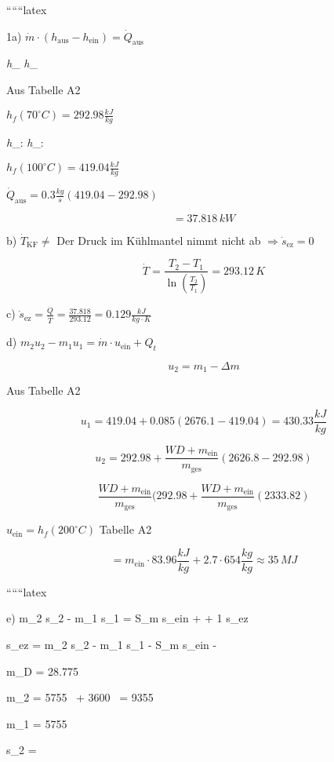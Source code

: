 
``````latex


1a) $\dot{m} \cdot (h_{\text{aus}} - h_{\text{ein}}) = \dot{Q}_{\text{aus}}$

\textit{h}_{} \textit{h}_{}

Aus Tabelle A2

$h_f(70^\circ C) = 292.98 \frac{kJ}{kg}$

\textit{h}_{}: \textit{h}_{}:

$h_f(100^\circ C) = 419.04 \frac{kJ}{kg}$

$\dot{Q}_{\text{aus}} = 0.3 \frac{kg}{s} (419.04 - 292.98)$

\[
= 37.818 \, kW
\]

b) $\dot{T}_{\text{KF}} \neq$ Der Druck im Kühlmantel nimmt nicht ab $\Rightarrow \dot{s}_{\text{ez}} = 0$

\[
\dot{T} = \frac{T_2 - T_1}{\ln \left( \frac{T_2}{T_1} \right)} = 293.12 \, K
\]

c) $\dot{s}_{\text{ez}} = \frac{\dot{Q}}{\dot{T}} = \frac{37.818}{293.12} = 0.129 \frac{kJ}{kg \cdot K}$

d) $m_2 u_2 - m_1 u_1 = \dot{m} \cdot u_{\text{ein}} + Q_t$

\[
u_2 = m_1 - \Delta m
\]

Aus Tabelle A2

\[
u_1 = 419.04 + 0.085 (2676.1 - 419.04) = 430.33 \frac{kJ}{kg}
\]

\[
u_2 = 292.98 + \frac{WD + m_{\text{ein}}}{m_{\text{ges}}} (2626.8 - 292.98)
\]

\[
\frac{WD + m_{\text{ein}}}{m_{\text{ges}}} (292.98 + \frac{WD + m_{\text{ein}}}{m_{\text{ges}}} (2333.82)
\]

$u_{\text{ein}} = h_f(200^\circ C)$ Tabelle A2

\[
= m_{\text{ein}} \cdot 83.96 \frac{kJ}{kg} + 2.7 \cdot 654 \frac{kg}{kg} \approx 35 \, MJ
\]

``````latex


e) \quad m_2 s_2 - m_1 s_1 = S_m s_{ein} +  + 1 s_{ez}

\quad s_{ez} = m_2 s_2 - m_1 s_1 - S_m s_{ein} - 

 \quad m_D = 28.775 \, 

\quad m_2 = 5755 \,  + 3600 \,  = 9355 \, 

\quad m_1 = 5755 \, 

\quad s_2 = 


